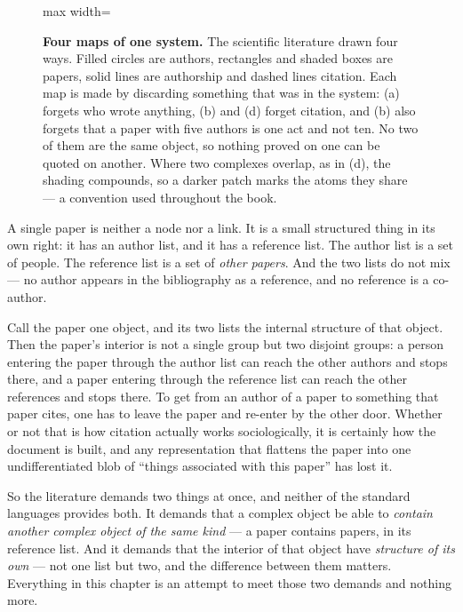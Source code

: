 \begin{figure}[t]
\begin{adjustbox}{max width=\linewidth}
\end{adjustbox}
\caption{\textbf{Four maps of one system.} The scientific literature drawn four
ways. Filled circles are authors, rectangles and shaded boxes are papers, solid
lines are authorship and dashed lines citation. Each map is made by discarding
something that was in the system: (a) forgets who wrote anything, (b) and (d)
forget citation, and (b) also forgets that a paper with five authors is one act
and not ten. No two of them are the same object, so nothing proved on one can be
quoted on another. Where two complexes overlap, as in (d), the shading
compounds, so a darker patch marks the atoms they share --- a convention used
throughout the book.}
\label{fig:projections}
\end{figure}

A single paper is neither a node nor a link. It is a small structured thing in its own right: it has an author list,
and it has a reference list. The author list is a set of people. The reference
list is a set of \emph{other papers}. And the two lists do not mix --- no author
appears in the bibliography as a reference, and no reference is a co-author.

Call the paper one object, and its two lists the internal structure of that
object. Then the paper's interior is not a single group but two disjoint groups: a
person entering the paper through the author list can reach the other authors
and stops there, and a paper entering through the reference list can reach the
other references and stops there. To get from an author of a paper to something
that paper cites, one has to leave the paper and re-enter by the other door.
Whether or not that is how citation actually works sociologically, it is
certainly how the document is built, and any representation that flattens the
paper into one undifferentiated blob of ``things associated with this paper''
has lost it.

So the literature demands two things at once, and neither of the standard
languages provides both. It demands that a complex object be able to
\emph{contain another complex object of the same kind} --- a paper contains
papers, in its reference list. And it demands that the interior of that object
have \emph{structure of its own} --- not one list but two, and the difference
between them matters. Everything in this chapter is an attempt to meet those
two demands and nothing more.

